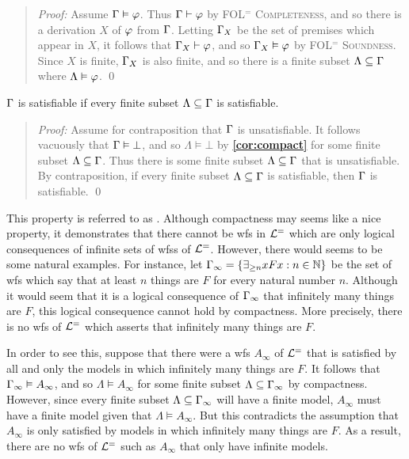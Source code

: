 \begin{quote} 
  \textit{Proof:} 
  Assume $\Gamma\vDash\varphi$.  
  Thus $\Gamma\vdash\varphi$ by \textsc{FOL$^=$ Completeness}, and so there is a derivation $X$ of $\varphi$ from $\Gamma$.
  Letting $\Gamma_X$ be the set of premises which appear in $X$, it follows that $\Gamma_X\vdash\varphi$, and so $\Gamma_X\vDash\varphi$ by \textsc{FOL$^=$ Soundness}.
  Since $X$ is finite, $\Gamma_X$ is also finite, and so there is a finite subset $\Lambda\subseteq\Gamma$ where $\Lambda\vDash\varphi$.
  \qed
\end{quote}



\begin{Cthm}[Compactness] \label{cor:compact2}
  $\Gamma$ is satisfiable if every finite subset $\Lambda\subseteq\Gamma$ is satisfiable.
\end{Cthm}

\begin{quote} 
  \textit{Proof:} 
  Assume for contraposition that $\Gamma$ is unsatisfiable. 
  It follows vacuously that $\Gamma\vDash\bot$, and so $\Lambda\vDash\bot$ by \textbf{\ref{cor:compact}} for some finite subset $\Lambda\subseteq\Gamma$.
  Thus there is some finite subset $\Lambda\subseteq\Gamma$ that is unsatisfiable. 
  By contraposition, if every finite subset $\Lambda\subseteq\Gamma$ is satisfiable, then $\Gamma$ is satisfiable. 
  \qed
\end{quote}


This property is referred to as .
Although compactness may seems like a nice property, it demonstrates that there cannot be wfs in $\mathcal{L}^{=}$ which are only logical consequences of infinite sets of wfss of $\mathcal{L}^{=}$.
However, there would seems to be some natural examples.
For instance, let $\Gamma_\infty=\lbrace\exists_{\geq n}xFx:n\in\mathbb{N}\rbrace$ be the set of wfs which say that at least $n$ things are $F$ for every natural number $n$. 
Although it would seem that it is a logical consequence of $\Gamma_\infty$ that infinitely many things are $F$, this logical consequence cannot hold by compactness.
More precisely, there is no wfs of $\mathcal{L}^{=}$ which asserts that infinitely many things are $F$.

In order to see this, suppose that there were a wfs $A_\infty$ of $\mathcal{L}^{=}$ that is satisfied by all and only the models in which infinitely many things are $F$.
It follows that $\Gamma_\infty\vDash A_\infty$, and so $\Lambda\vDash A_\infty$ for some finite subset $\Lambda\subseteq\Gamma_\infty$ by compactness.
However, since every finite subset $\Lambda\subseteq\Gamma_\infty$ will have a finite model, $A_\infty$ must have a finite model given that $\Lambda\vDash A_\infty$. 
But this contradicts the assumption that $A_\infty$ is only satisfied by models in which infinitely many things are $F$.
As a result, there are no wfs of $\mathcal{L}^{=}$ such as $A_\infty$ that only have infinite models. %

